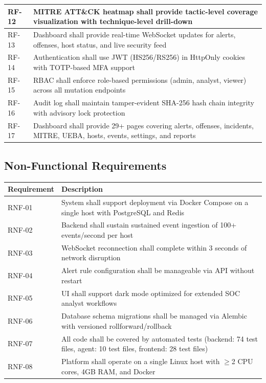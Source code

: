 \begin{longtable}{|l|l|}
\hline
RF-12 & MITRE ATT\&CK heatmap shall provide tactic-level coverage visualization with technique-level drill-down \\
\hline
RF-13 & Dashboard shall provide real-time WebSocket updates for alerts, offenses, host status, and live security feed \\
\hline
RF-14 & Authentication shall use JWT (HS256/RS256) in HttpOnly cookies with TOTP-based MFA support \\
\hline
RF-15 & RBAC shall enforce role-based permissions (admin, analyst, viewer) across all mutation endpoints \\
\hline
RF-16 & Audit log shall maintain tamper-evident SHA-256 hash chain integrity with advisory lock protection \\
\hline
RF-17 & Dashboard shall provide 29+ pages covering alerts, offenses, incidents, MITRE, UEBA, hosts, events, settings, and reports \\
\hline
\end{longtable}

\subsection{Non-Functional Requirements}

\begin{longtable}{|l|l|}
\hline
\textbf{Requirement} & \textbf{Description} \\
\hline
RNF-01 & System shall support deployment via Docker Compose on a single host with PostgreSQL and Redis \\
\hline
RNF-02 & Backend shall sustain sustained event ingestion of 100+ events/second per host \\
\hline
RNF-03 & WebSocket reconnection shall complete within 3 seconds of network disruption \\
\hline
RNF-04 & Alert rule configuration shall be manageable via API without restart \\
\hline
RNF-05 & UI shall support dark mode optimized for extended SOC analyst workflows \\
\hline
RNF-06 & Database schema migrations shall be managed via Alembic with versioned rollforward/rollback \\
\hline
RNF-07 & All code shall be covered by automated tests (backend: 74 test files, agent: 10 test files, frontend: 28 test files) \\
\hline
RNF-08 & Platform shall operate on a single Linux host with $\ge$2 CPU cores, 4GB RAM, and Docker \\
\hline
\end{longtable}

